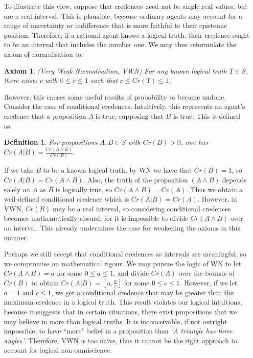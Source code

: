 \documentclass[12pt]{article}
\newtheorem{definition}{Definition}
\newtheorem{axiom}{Axiom}
\begin{document}
To illustrate this view, suppose that credences need not be single real values, but are a real interval. This is plausible, because ordinary agents may account for a range of uncertainty or indifference that is more faithful to their epistemic position. Therefore, if a rational agent knows a logical truth, their credence ought to be an interval that includes the number one.\autocite{sep} We may thus reformulate the axiom of normalisation to:
\begin{axiom}
    (Very Weak Normalisation, VWN) For any known logical truth $T\in S$, there exists $c$ with $0\leq c\leq 1$ such that $c\leq Cr(T)\leq1$.
\end{axiom}
However, this causes some useful results of probability to become undone. Consider the case of conditional credences. Intuitively, this represents an agent's credence that a proposition $A$ is true, supposing that $B$ is true.\autocite[32]{bdrc} This is defined as:
\begin{definition}
    For propositions $A,B\in S$ with $Cr(B)>0$, one has $Cr(A|B)=\frac{Cr(A\land B)}{Cr(B)}$.
\end{definition}
If we take $B$ to be a known logical truth, by WN we have that $Cr(B)=1$, so $Cr(A|B)=Cr(A\land B)$. Also, the truth of the proposition $(A\land B)$ depends solely on $A$ as $B$ is logically true, so $Cr(A\land B)=Cr(A)$. Thus we obtain a well-defined conditional credence which is $Cr(A|B)=Cr(A)$. However, in VWN, $Cr(B)$ may be a real interval, so considering conditional credences becomes mathematically absurd, for it is impossible to divide $Cr(A\land B)$ over an interval. This already undermines the case for weakening the axioms in this manner.

Perhaps we still accept that conditional credences as intervals are meaningful, so we compromise on mathematical rigour. We may pursue the logic of WN to let $Cr(A\land B)=a$ for some $0\leq a\leq1$, and divide $Cr(A)$ over the bounds of $Cr(B)$ to obtain $Cr(A|B)=[a,\frac{a}{c}]$ for some $0\leq c\leq1$. However, if we let $a=1$ and $c\leq 1$, we get a conditional credence that may be greater than the maximum credence in a logical truth. This result violates our logical intuitions, because it suggests that in certain situations, there exist propositions that we may believe in more than logical truths. It is inconceivable, if not outright impossible, to have ``more'' belief in a proposition than \textit{`A triangle has three angles'}. Therefore, VWN is too na\"ive, thus it cannot be the right approach to account for logical non-omniscience.
\end{document}
